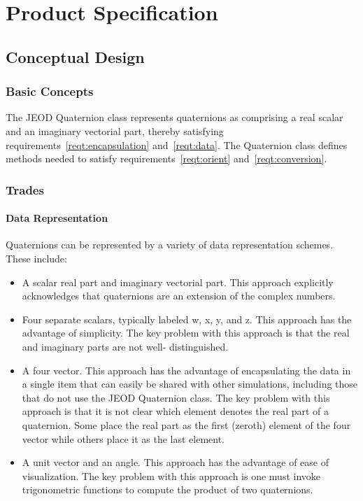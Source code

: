 \chapter{Product Specification}\label{ch:spec}

\section{Conceptual Design}

\subsection{Basic Concepts}
The JEOD Quaternion class represents quaternions as
comprising a real scalar and an imaginary vectorial part,
thereby  satisfying requirements~\ref{reqt:encapsulation}
and~\ref{reqt:data}.
The Quaternion class defines methods needed to satisfy
requirements~\ref{reqt:orient} and~\ref{reqt:conversion}.

\subsection{Trades}
\subsubsection{Data Representation}
Quaternions can be represented by a variety of data representation  
schemes. These include:
\begin{itemize}
\item A scalar real part and imaginary vectorial part. This approach  
explicitly acknowledges that quaternions are an extension of the  
complex numbers.
\item Four separate scalars, typically labeled w, x, y, and z. This  
approach has the advantage of simplicity. The key problem with this  
approach is that the real and imaginary parts are not well-
distinguished.
\item A four vector. This approach has the advantage of encapsulating the  
data in a single item that can easily be shared with other  
simulations, including those that do not use the JEOD Quaternion  
class. The  key problem with this approach is that it is not clear
which element denotes the real part of a quaternion. Some place the  
real part as the first (zeroth) element of the four vector while  
others place it as the last element.
\item A unit vector and an angle. This approach has the advantage of ease  
of visualization. The key problem with this approach is one must  
invoke trigonometric functions to compute the product of two  
quaternions.
\end{itemize}


